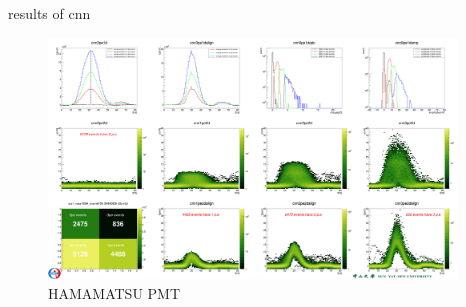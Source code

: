 \documentclass[11pt,compress,xcolor=x11names,UTF8]{beamer}
\begin{document}
%
%
%
\begin{frame}{results of cnn}
\begin{figure}
\centering
\vspace{-.4cm}
\includegraphics[width=0.968\textwidth]{cnnham} %
\caption{HAMAMATSU PMT}
\end{figure}
\end{frame}
\end{document}
